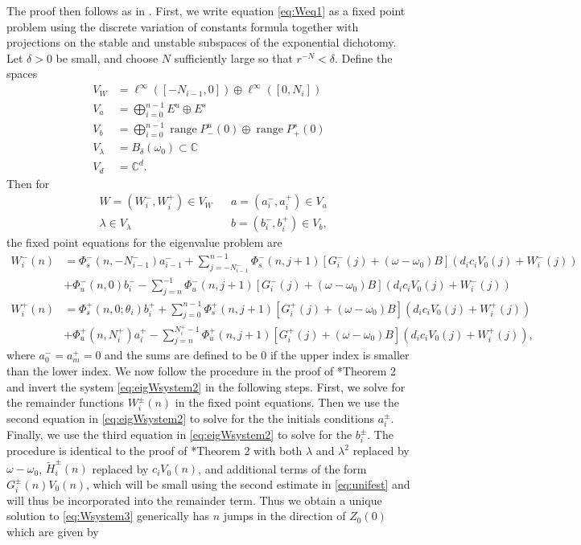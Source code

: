 \documentclass[12pt,reqno]{amsart}
\def\C{{\mathbb C}}
\DeclareMathOperator{\ran}{range}
\begin{document}
The proof then follows as in \cites{Parker2020,Sandstede1998}. First, we write equation \cref{eq:Weq1} as a fixed point problem using the discrete variation of constants formula together with projections on the stable and unstable subspaces of the exponential dichotomy. Let $\delta > 0$ be small, and choose $N$ sufficiently large so that $r^{-N} < \delta$. Define the spaces
\begin{align*}
V_W &= \ell^\infty([-N_{i-1}, 0]) \oplus \ell^\infty([0, N_i])  \\
V_a &= \bigoplus_{i=0}^{n-1} E^u \oplus E^s \\
V_b &= \bigoplus_{i=0}^{n-1} \ran P_-^u(0) \oplus \ran P_+^s(0)\\
V_\lambda &= B_\delta(\omega_0) \subset \C \\
V_d &= \C^d.
\end{align*}
Then for
\begin{align*}
&W = (W_i^-, W_i^+) \in V_W  && a = (a_i^-, a_i^+) \in V_a \\
&\lambda \in V_\lambda  &&b = (b_i^-, b_i^+) \in V_b,
\end{align*}
the fixed point equations for the eigenvalue problem are
\begin{equation*}\label{fpeig}
\begin{aligned}
W_i^-(n) &= 
\Phi_s^-(n, -N_{i-1}^-) a_{i-1}^- + \sum_{j = -N_{i-1}^-}^{n-1} \Phi_s^-(n, j+1)
[G_i^-(j) + (\omega - \omega_0) B](d_i c_i V_0(j) + W_i^-(j))
 \\
&+ \Phi_u^-(n, 0) b_i^- - \sum_{j = n}^{-1} \Phi_u^-(n, j+1) 
[G_i^-(j) + (\omega - \omega_0) B](d_i c_i V_0(j) + W_i^-(j))\\
W_i^+(n) &= \Phi_s^+(n, 0; \theta_i) b_i^+ + \sum_{j = 0}^{n-1} \Phi_s^+(n, j+1) 
[G_i^+(j) + (\omega - \omega_0) B](d_i c_i V_0(j) + W_i^+(j))\\
&+ \Phi_u^+(n, N_i^+) a_i^+ - \sum_{j = n}^{N_i^+-1} \Phi_u^+(n, j+1) 
[G_i^+(j) + (\omega - \omega_0) B](d_i c_i V_0(j) + W_i^+(j)),
\end{aligned}
\end{equation*}
where $a_0^- = a_m^+ = 0$ and the sums are defined to be $0$ if the upper index is smaller than the lower index. We now follow the procedure in the proof of \cite{Parker2020}*{Theorem 2} and invert the system \cref{eq:eigWsystem2} in the following steps. First, we solve for the remainder functions $W_i^\pm(n)$ in the fixed point equations. Then we use the second equation in \cref{eq:eigWsystem2} to solve for the  the initials conditions $a_i^\pm$. Finally, we use the third equation in \cref{eq:eigWsystem2} to solve for the $b_i^\pm$. The procedure is identical to the proof of \cite{Parker2020}*{Theorem 2} with both $\lambda$ and $\lambda^2$ replaced by $\omega - \omega_0$, $\tilde{H}_i^\pm(n)$ replaced by $c_i V_0(n)$, and additional terms of the form $G_i^\pm(n) V_0(n)$, which will be small using the second estimate in \cref{eq:unifest} and will thus be incorporated into the remainder term. Thus we obtain a unique solution to \cref{eq:Wsystem3} generically has $n$ jumps in the direction of $Z_0(0)$ which are given by 
\end{document}
